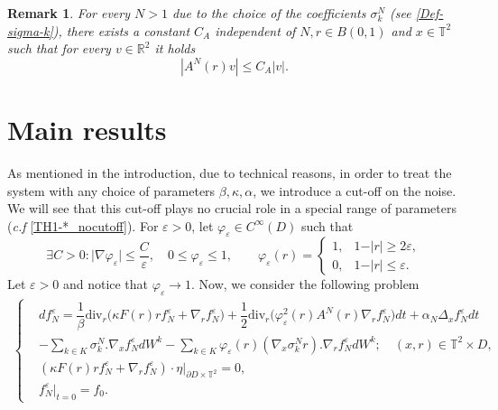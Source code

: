 \documentclass[a4paper,12pt, reqno]{amsart}
\newtheorem{remark}[theorem]{Remark}
\newcommand{\T}{\mathbb{T}}
\newcommand{\R}{\mathbb{R}}
\renewcommand{\k}{\kappa}
\def\yas#1{\textcolor{blue!98!black}{#1} }
\newcommand{\Div}{\text{div}}
\begin{document}
      \begin{remark}\label{rmq-bound_A^N}
            For every $N>1$ due to the choice of the coefficients $\sigma_k^N$ (see \eqref{Def-sigma-k}), there exists a constant $C_A$ independent of $N, r\in B(0, 1)$ and $x\in \T^2$ such that for every $v\in \R^2$ it holds
            $$|A^N(r)v| \le C_A|v|.$$
              \end{remark}

\section{Main results}\label{Section-main-results} 
As mentioned in the introduction, due to technical reasons, in order to treat the system with any choice of parameters $\beta, \kappa, \alpha$, we introduce a cut-off on the noise. We will see that this cut-off plays no crucial role in a special range of parameters (\textit{c.f} \autoref{TH1-*_nocutoff}). For $\varepsilon>0$, let $\varphi_\varepsilon\in C^\infty(D)$ such that
\[\exists C>0: \vert \nabla \varphi_\varepsilon \vert \leq \dfrac{C}{\varepsilon}, \quad
0\le\varphi_\varepsilon\le 1,
\qquad
\varphi_\varepsilon(r)=
\begin{cases}
1, & 1-\vert r\vert\ge 2\varepsilon,\\
0, & 1-\vert r\vert\le \varepsilon.
\end{cases}
\]  Let $\varepsilon>0$ and  notice that  $\varphi_\varepsilon \to 1.$ 
Now,  we consider the following problem
\begin{align}\label{Ito-FP_eps-V2}
		\begin{cases}&df^{\varepsilon}_N=	\dfrac{1}{\beta}\Div_r \big(\k F(r) rf^{\varepsilon}_N+	\nabla_rf^{\varepsilon}_N\big) +\dfrac{1}{2}\Div_r \big( \varphi_\varepsilon^2(r) A^N(r) \nabla_rf^{\varepsilon}_N\big)dt +\alpha_N\Delta_x f^{\varepsilon}_Ndt\\[0.15cm]
            &-\sum_{k\in K}\sigma_k^N.\nabla_xf^{\varepsilon}_NdW^k -\sum_{k\in K}\varphi_\varepsilon(r)(\nabla_x \sigma_k^Nr).\nabla_rf^{\varepsilon}_N dW^k  ;\quad (x,r)\in \mathbb{T}^2\times D,\\[0.15cm]
            & \left( \kappa F(r)r f^{\varepsilon}_N + \nabla_r f^{\varepsilon}_N \right)\cdot \eta \vert_{\partial D\times \mathbb{T}^2} = 0,
            \\[0.15cm]
            			&f^{\varepsilon}_N|_{t=0}=f_0.
	\end{cases}\end{align}
\end{document}
